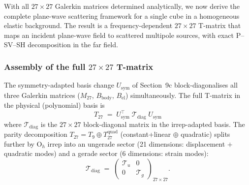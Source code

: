 With all $27 \times 27$ Galerkin matrices determined analytically, we now
derive the complete plane-wave scattering framework for a single cube in
a homogeneous elastic background.  The result is a frequency-dependent
$27 \times 27$ T-matrix that maps an incident plane-wave field to scattered
multipole sources, with exact P--SV--SH decomposition in the far field.

\subsubsection{Assembly of the full
\texorpdfstring{$27 \times 27$}{27x27} T-matrix}
\label{sec:T27-assembly}

The symmetry-adapted basis change $U_{\mathrm{sym}}$ of Section~9c
block-diagonalises all three Galerkin matrices ($M_{27}$,
$B_{\mathrm{body}}$, $B_{\mathrm{el}}$) simultaneously.  The full
T-matrix in the physical (polynomial) basis is
\begin{equation}
  \boxed{\;T_{27}
  \;=\; U_{\mathrm{sym}}^{\top}\;
  \mathcal{T}_{\mathrm{diag}}\;
  U_{\mathrm{sym}}\;}
  \label{eq:T27-assembly}
\end{equation}
where $\mathcal{T}_{\mathrm{diag}}$ is the $27 \times 27$
block-diagonal matrix in the irrep-adapted basis.  The parity
decomposition $T_{27} = T_9 \oplus T_{27}^{\mathrm{quad}}$
(constant+linear $\oplus$ quadratic) splits further by O$_h$ irrep
into an ungerade sector (21 dimensions: displacement $+$ quadratic
modes) and a gerade sector (6 dimensions: strain modes):
\begin{equation}
  \mathcal{T}_{\mathrm{diag}}
  \;=\;
  \begin{pmatrix}
    \mathcal{T}_u & 0 \\[2pt]
    0 & \mathcal{T}_g
  \end{pmatrix}_{\!27\times 27}.
  \label{eq:T-parity-split}
\end{equation}


